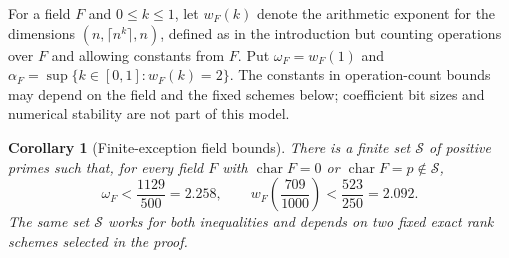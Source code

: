 \documentclass[11pt]{article}
\numberwithin{equation}{section}
\newtheorem{corollary}[theorem]{Corollary}
\theoremstyle{definition}
\theoremstyle{remark}
\begin{document}
For a field \(F\) and \(0\le k\le1\), let \(w_F(k)\) denote the arithmetic exponent for
the dimensions \((n,\lceil n^k\rceil,n)\), defined as in the
introduction but counting operations over \(F\) and allowing constants
from \(F\).  Put \(\omega_F=w_F(1)\) and
\(\alpha_F=\sup\{k\in[0,1]:w_F(k)=2\}\).  The constants in operation-count
bounds may depend on the field and the fixed schemes below; coefficient
bit sizes and numerical stability are not part of this model.

\begin{corollary}[Finite-exception field bounds]\label{cor:characteristic-transfer}
There is a finite set \(\mathcal S\) of positive primes such that, for
every field \(F\) with \(\operatorname{char}F=0\) or
\(\operatorname{char}F=p\notin\mathcal S\),
\[
 \omega_F<\frac{1129}{500}=2.258,\qquad
 w_F\!\left(\frac{709}{1000}\right)<\frac{523}{250}=2.092.
\]
The same set \(\mathcal S\) works for both inequalities and depends on
two fixed exact rank schemes selected in the proof.
\end{corollary}
\end{document}
